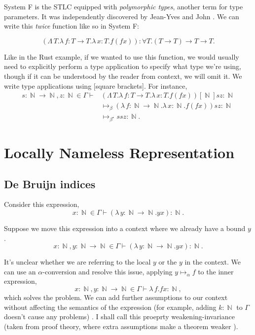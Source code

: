 \documentclass[logo,bsc,singlespacing,parskip,online]{infthesis}
\DeclareMathOperator{\nat}{\mathbb{N}}
\begin{document}
System F is the STLC equipped with \textit{polymorphic types}, another term for type parameters. It
was independently discovered by Jean-Yves \citet{girard_interpretation_1972} and John
\citet{goos_towards_1974}. We can write this \textit{twice} function like so in System F:

\begin{equation*}
  (\Lambda \, T. \lambda \, f \colon T \to T . \lambda \, x \colon T . f (f x))
  \colon \forall T . (T \to T) \to T \to T.
\end{equation*}

Like in the Rust example, if we wanted to use this function, we would usually need to explicitly
perform a type application to specify what type we're using, though if it can be understood by the
reader from context, we will omit it. We write type applications using [square brackets]. For
instance,
\begin{align*}
  s \colon \nat \to \nat, z \colon \nat \in \Gamma \vdash
  &(\Lambda \, T. \lambda \, f \colon T \to T . \lambda \, x \colon T . f (f x))[\nat] s z \colon \nat\\
  &\mapsto_{\beta} (\lambda \, f \colon \nat \to \nat . \lambda \, x \colon \nat . f (f x)) s z \colon \nat\\
  &\mapsto_{\beta^{\star}} s s z \colon \nat.
\end{align*}

\section{Locally Nameless Representation}

\subsection{De Bruijn indices}
\label{section:background_debruijn}
Consider this expression,
\begin{equation*}
  x \colon \nat \in \Gamma \vdash (\lambda \, y \colon \nat \to \nat. y x) \colon \nat.
\end{equation*}

Suppose we move this expression into a context where we already have a bound
$y$.
\begin{equation*}
  x \colon \nat, y \colon \nat \to \nat \in \Gamma \vdash (\lambda \, y \colon \nat \to \nat. y x) \colon \nat.
\end{equation*}

It's unclear whether we are referring to the local $y$ or the $y$ in the context. We can use an
$\alpha$-conversion and resolve this issue, applying $y \mapsto_{\alpha} f$ to the inner expression,
\begin{equation*}
  x \colon \nat, y \colon \nat \to \nat \in \Gamma \vdash \lambda \, f. f x \colon \nat,
\end{equation*}
which solves the problem. We can add further assumptions to our context without affecting the
semantics of the expression (for example, adding $k \colon \nat$ to $\Gamma$ doesn't cause any
problems) \cite{pitts_locally_2023}. I shall call this proeprty weakening-invariance (taken from
proof theory, where extra assumptions make a theorem weaker \citep{buss_handbook_1998}).
\end{document}
